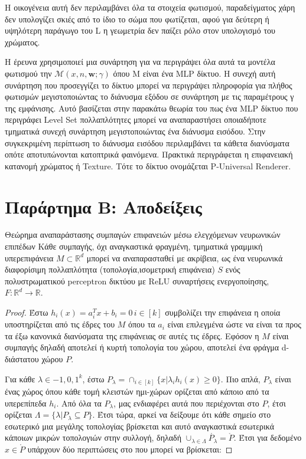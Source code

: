 \begin{appendices}
    Η οικογένεια αυτή δεν περιλαμβάνει όλα τα στοιχεία φωτισμού, παραδείγματος χάρη δεν υπολογίζει σκιές από το ίδιο το σώμα που φωτίζεται, αφού για δεύτερη ή υψηλότερη παράγωγο του L η γεωμετρία δεν παίζει ρόλο στον υπολογισμό του χρώματος.

    Η έρευνα χρησιμοποιεί μια συνάρτηση για να περιγράψει όλα αυτά τα μοντέλα φωτισμού την \(\mathcal{M}(x,n,\boldsymbol{w};\gamma)\) όπου M είναι ένα MLP δίκτυο. Η συνεχή αυτή συνάρτηση που προσεγγίζει το δίκτυο μπορεί να περιγράψει πληροφορία για πλήθος φωτισμών μεγιστοποιώντας το διάνυσμα εξόδου σε συνάρτηση με τις παραμέτρους γ της εμφάνισης. Αυτό βασίζεται στην παρακάτω θεωρία του πως ένα MLP δίκτυο που περιγράφει Level Set πολλαπλότητες μπορεί να αναπαραστήσει οποιαδήποτε τμηματικά συνεχή συνάρτηση μεγιστοποιώντας ένα διάνυσμα εισόδου. Στην συγκεκριμένη περίπτωση το διάνυσμα εισόδου περιλαμβάνει τα κάθετα διανύσματα οπότε αποτυπώνονται κατοπτρικά φαινόμενα. Πρακτικά περιγράφεται η επιφανειακή κατανομή χρώματος ή Texture. Τότε το δίκτυο ονομάζεται P-Universal Renderer.

    \section*{Παράρτημα Β: Αποδείξεις}
    \begin{theorem}{Θεώρημα αναπαράστασης συμπαγών επιφανειών μέσω ελεγχόμενων νευρωνικών επιπέδων}
        Κάθε συμπαγής, όχι αναγκαστικά φραγμένη, τμηματικά γραμμική υπερεπιφάνεια ${M} \subset \mathbb{R}^d$  μπορεί να αναπαρασταθεί με ακρίβεια, ως ένα νευρωνικά διαφορίσιμη πολλαπλότητα (τοπολογία,ισομετρική επιφάνεια) ${S}$ ενός πολυστρωματικού perceptron δικτύου με ReLU συναρτήσεις ενεργοποίησης,
        ${F}:\mathbb{R}^d \rightarrow \mathbb{R}$. 
    \end{theorem}
    \begin{proof}
        Έστω $h_i(x) = a_{i}^T x + b_{i} =  0\, i \in [k]$  συμβολίζει την επιφάνεια η οποία υποστηρίζεται από τις έδρες του ${M}$ όπου τα $a_i$ είναι επιλεγμένα ώστε να είναι τα προς τα έξω κανονικά διανύσματα της επιφάνειας σε αυτές τις έδρες. Εφόσον η ${M}$ είναι συμπαγής δηλαδή αποτελεί  ή κυρτή τοπολογία του χώρου, αποτελεί ένα φράγμα d-διάστατου χώρου ${P}$.

        Για κάθε \(\lambda \in {-1,0,1}^{k}\), έστω \({P_\lambda} = \cap_{i \in [k]}\{x | \lambda_{i}h_{i}(x) \geq 0 \}\). Πιο απλά, \({P_\lambda}\) είναι ένας χώρος όπου κάθε τομή κλειστών ημι-χώρων ορίζεται από κάποιο από τα υπερεπίπεδα \(h_i\). Από όλα τα \({P}_\lambda\), μας ενδιαφέρει αυτά που περιέχονται στο \({P}\), έτσι ορίζεται \(\Lambda = \{\lambda | {P_\lambda} \subseteq {P}\}\). Έτσι τώρα, αρκεί να δείξουμε ότι κάθε σημείο στο εσωτερικό μια μεγάλης τοπολογίας βρίσκεται και αυτό αναγκαστικά εσωτερικά κάποιων μικρών τοπολογιών στην συλλογή, δηλαδή \(\cup_{\lambda \in \Lambda} \mathring{{P_{\lambda}}} = \mathring{{P}}\). Έτσι για δεδομένο $x \in \mathring{P}$ υπάρχουν δύο περιπτώσεις στο που μπορεί να βρίσκεται:


\end{proof}
\end{appendices}
